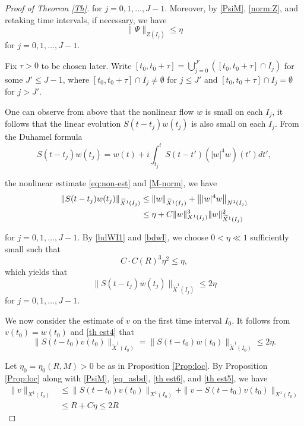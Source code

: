 \documentclass[letterpaper, 11pt,  reqno]{amsart}
\newcommand{\1}{\hspace{0.5mm}\text{I}\hspace{0.5mm}}
\newcommand{\noi}{\noindent}
\newcommand{\wt}{\widetilde}
\numberwithin{equation}{section}
\numberwithin{theorem}{section}
\begin{document}
\begin{proof}[Proof of Theorem \ref{Th}]
\noi
for $j=0,1,\dots, J-1$. 
Moreover,
by
\eqref{PsiM}, \eqref{norm:Z},
and retaking time intervals, if necessary,
we have
\begin{equation}
\label{th est6}
\|\Psi\|_{Z(I_j)}
\le
\eta
\end{equation}
for $j=0,1,\dots, J-1$.

Fix $\tau>0$ to be chosen later.
Write $[t_0,t_0+\tau] = \bigcup_{j=0}^{J'} ([t_0,t_0+\tau] \cap I_j)$
for some $J' \le J-1$,
where
$[t_0,t_0+\tau] \cap I_j \neq \emptyset$ for $j \le J'$
and
$[t_0,t_0+\tau] \cap I_j = \emptyset$ for $j > J'$.


One can observe from above that the nonlinear flow $w$ is small on each $I_j$,
it follows that the linear evolution $S(t - t_j )w(t_j )$ is also small on each $I_j$.
From 
the Duhamel formula
\[
S(t - t_j )w(t_j )
=
w(t) + i
\int_{t_j}^t S(t-t') (|w|^4w)(t') dt',
\]

\noi
the nonlinear estimate \eqref{eq:non-est}
and \eqref{M-norm},
we have
\begin{align}
\notag
\begin{aligned}
    \|S(t-t_j)w(t_j)\|_{\wt X^1(I_j)}
    &\leq \|w\|_{\wt X^1(I_j)}
    +
    \big\| |w|^4w \big\|_{N^1(I_j)} \\
    &\le
    \eta+C \|w\|_{X^1(I_j)}^3 \|w\|_{\wt X^1(I_j)}^2
    \end{aligned}
\end{align}



\noi
for $j=0,1,\dots, J-1$.
By \eqref{bdWI1} and \eqref{bdwI},
we choose $0<\eta\ll1$ sufficiently small 
such that
\[
C \cdot C(R)^3 \eta^2 \leq \eta,
\]
which yields that
\begin{equation}
\label{th est4}
\|S(t-t_j)w(t_j)\|_{\wt X^1(I_j)}
\le
2\eta
\end{equation}
for $j=0,1,\dots, J-1$.



We now consider the estimate of $v$ on the first time interval 
$I_0$.
It follows from $v(t_0)=w(t_0)$ and \eqref{th est4} that
\begin{equation}
\label{th est5}
    \|S(t-t_0)v(t_0)\|_{\wt X^1(I_0)}
    =
    \|S(t-t_0)w(t_0)\|_{\wt X^1(I_0)}
    \le 2\eta.
\end{equation}


\noi
Let $\eta_0=\eta_0(R,M)>0$ be as in Proposition \ref{Prop:loc}.
By Proposition \ref{Prop:loc}
along with \eqref{PsiM}, \eqref{eq_asbd}, \eqref{th est6}, and \eqref{th est5},
we have
\begin{equation}
\begin{aligned}
\|v\|_{X^1(I_0)}
&\le
\|S(t-t_0) v(t_0) \|_{X^1(I_0)}
+
\|v-S(t-t_0) v(t_0) \|_{X^1(I_0)}
\\
&\le
R + C \eta
\le 2R
\label{vI0a}
\end{aligned}
\end{equation}





\end{proof}
\end{document}
